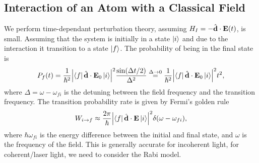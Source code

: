 \subsection{Interaction of an Atom with a Classical Field}
We perform time-dependant perturbation theory, assuming $H_I = -\hat{\bm{\mathrm{d}}} \cdot \bm{\mathrm{E}}(t)$, is small. Assuming that the system is initially in a state $\ket{i}$ and due to the interaction it transition to a state $\ket{f}$. The probability of being in the final state is
\begin{equation}
    P_f(t) = \frac{1}{\hbar^2} \abs{\bra{f} \hat{\bm{\mathrm{d}}} \cdot \bm{\mathrm{E}}_0 \ket{i}}^2 \frac{\sin (\Delta t/2)}{\Delta^2} \stackrel{\Delta \to 0}{=} \frac{1}{\hbar^2} \abs{\bra{f} \hat{\bm{\mathrm{d}}} \cdot \bm{\mathrm{E}}_0 \ket{i}}^2 t^2,
\end{equation}
where $\Delta = \omega - \omega_{fi}$ is the detuning between the field frequency and the transition frequency. The transition probability rate is given by Fermi's golden rule
\begin{equation}
    W_{i\to f} \approx \frac{2\pi}{\hbar} \abs{\bra{f} \hat{\bm{\mathrm{d}}} \cdot \bm{\mathrm{E}} \ket{i}}^2 \delta(\omega - \omega_{fi}),
\end{equation}
where $\hbar\omega_{fi}$ is the energy difference between the initial and final state, and $\omega$ is the frequency of the field. This is generally accurate for incoherent light, for coherent/laser light, we need to consider the Rabi model.


